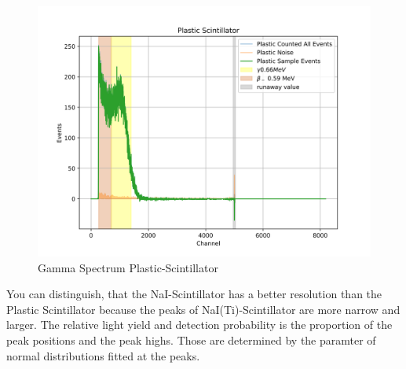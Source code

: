 \documentclass[12pt,twoside,a4paper]{scrartcl}
\begin{document}
            \begin{figure}[H]
							\centering
                \includegraphics[width = 0.8 \textwidth]{Plots/Scinti/SpektrenPlastic.png}
                \caption{Gamma Spectrum Plastic-Scintillator}
            \end{figure}
            You can distinguish, that the NaI-Scintillator has a better resolution
            than the Plastic Scintillator because the peaks of NaI(Ti)-Scintillator
            are more narrow and larger. The relative light yield and detection probability is the proportion
            of the peak positions and the peak highs. Those are determined by the
            paramter of normal distributions fitted at the peaks.
\end{document}
